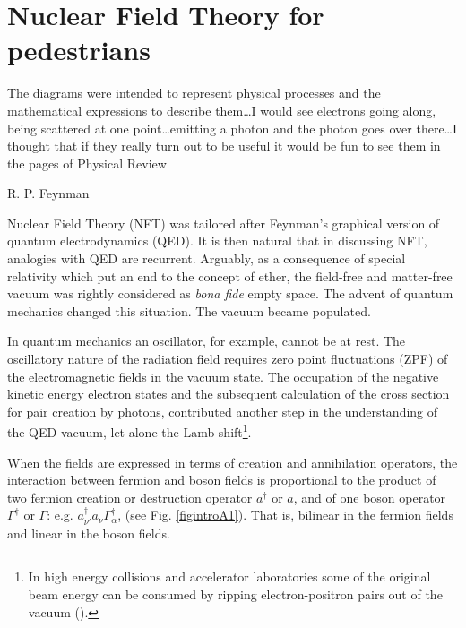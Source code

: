 \section{Nuclear Field Theory for pedestrians}\label{appintroA}
\epigraph{The diagrams were intended to represent physical processes and the mathematical expressions to describe them\dots I would see electrons going along, being scattered at one point\dots emitting a photon and the photon goes over there\dots I thought that if they really turn out to be useful it would be fun to see them in the pages of Physical Review}{R. P. Feynman}
Nuclear Field Theory (NFT) was tailored after Feynman's graphical version of quantum electrodynamics (QED). It is then natural that in discussing NFT, analogies with QED are recurrent.   Arguably, as a consequence of special relativity which put an end to the concept of ether, the field-free and matter-free vacuum was rightly considered as \textit{bona fide} empty space. The advent of quantum mechanics changed this situation.  The vacuum became populated.

 In quantum mechanics an oscillator, for example, cannot be at rest. The oscillatory nature of the radiation field requires zero point fluctuations (ZPF) of the electromagnetic fields in the vacuum state. The occupation of the negative kinetic energy electron states and the subsequent calculation of the cross section for pair creation by photons, contributed another step in the understanding of the QED vacuum, let alone the Lamb shift\footnote{In high energy collisions and accelerator laboratories some of the original beam energy can be consumed by ripping electron-positron pairs out of the vacuum (\cite{Bruce:07}).}.


When the fields are expressed in terms of creation and annihilation operators, the interaction between  fermion and boson fields is proportional to the product of two fermion creation or destruction operator $a^\dagger$ or $a$, and of one boson operator $\Gamma^\dagger$ or $\Gamma$: e.g. $a^\dagger_{\nu'}a_\nu\Gamma_\alpha^\dagger$, (see Fig. \ref{figintroA1}). That is,  bilinear in the fermion fields and linear in the boson fields.

